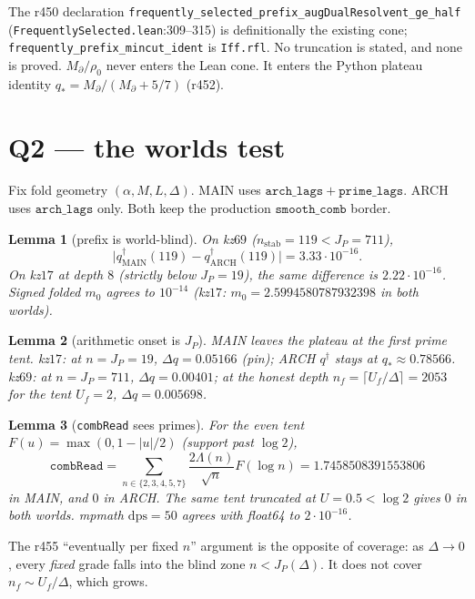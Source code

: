 \documentclass[11pt]{article}
\newtheorem{lemma}{Lemma}
\theoremstyle{remark}
\newcommand{\nstab}{n_{\mathrm{stab}}}
\newcommand{\nf}{n_f}
\begin{document}
The r450 declaration
\texttt{frequently\_selected\_prefix\_augDualResolvent\_ge\_half}
(\texttt{FrequentlySelected.lean}:309--315) is
definitionally the existing cone;
\texttt{frequently\_prefix\_mincut\_ident} is
\texttt{Iff.rfl}.  No truncation is stated,
and none is proved.
$M_{\partial}/\rho_0$ never enters the Lean cone.
It enters the Python plateau identity
$q_*=M_{\partial}/(M_{\partial}+5/7)$ (r452).

\section{Q2 --- the worlds test}\label{sec:q2}

Fix fold geometry $(\alpha,M,L,\Delta)$.
MAIN uses $\mathtt{arch\_lags}+\mathtt{prime\_lags}$.
ARCH uses $\mathtt{arch\_lags}$ only.
Both keep the production $\mathtt{smooth\_comb}$
border.

\begin{lemma}[prefix is world-blind]\label{lem:vac}
On kz$69$ ($\nstab=119<J_P=711$),
\[
\bigl|q^{\dagger}_{\mathrm{MAIN}}(119)
-q^{\dagger}_{\mathrm{ARCH}}(119)\bigr|
=3.33\cdot 10^{-16}.
\]
On kz$17$ at depth $8$ (strictly below $J_P=19$),
the same difference is $2.22\cdot 10^{-16}$.
Signed folded $m_0$ agrees to $10^{-14}$
(kz$17$: $m_0=2.5994580787932398$ in both worlds).
\end{lemma}

\begin{lemma}[arithmetic onset is $J_P$]\label{lem:arith}
MAIN leaves the plateau at the first prime tent.
kz$17$: at $n=J_P=19$,
$\Delta q=0.05166$ (pin);
ARCH $q^{\dagger}$ stays at $q_*\approx 0.78566$.
kz$69$: at $n=J_P=711$, $\Delta q=0.00401$;
at the honest depth $\nf=\lceil U_f/\Delta\rceil=2053$
for the tent $U_f=2$, $\Delta q=0.005698$.
\end{lemma}

\begin{lemma}[\texttt{combRead} sees primes]\label{lem:comb}
For the even tent $F(u)=\max(0,1-|u|/2)$
(support past $\log 2$),
\[
\texttt{combRead}
=\sum_{n\in\{2,3,4,5,7\}}\frac{2\Lambda(n)}{\sqrt n}F(\log n)
=1.7458508391553806
\]
in MAIN, and $0$ in ARCH.
The same tent truncated at $U=0.5<\log 2$
gives $0$ in both worlds.
mpmath $\mathrm{dps}=50$ agrees with float64
to $2\cdot 10^{-16}$.
\end{lemma}

The r455 ``eventually per fixed $n$'' argument
is the opposite of coverage: as $\Delta\to 0$,
every \emph{fixed} grade falls into the blind
zone $n<J_P(\Delta)$.  It does not cover
$\nf\sim U_f/\Delta$, which grows.
\end{document}
